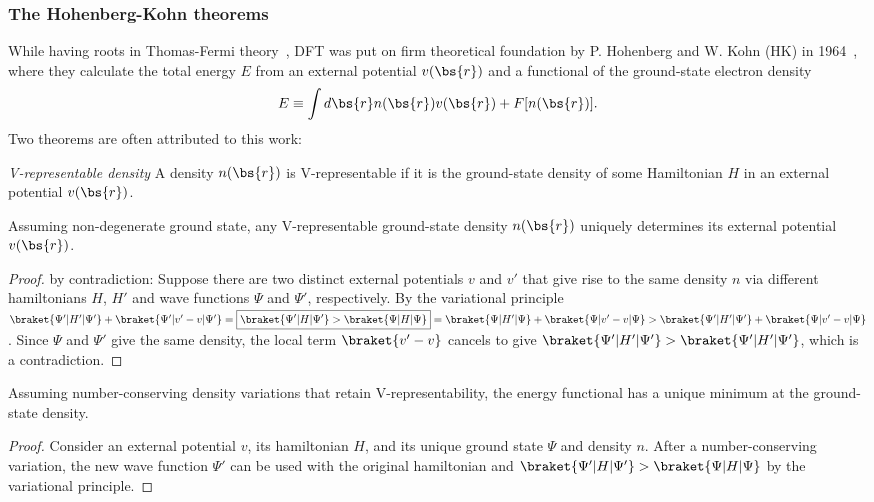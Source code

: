 \subsubsection{The Hohenberg-Kohn theorems}
While having roots in Thomas-Fermi theory~\cite{Parr1989}, DFT was put on firm theoretical foundation by P. Hohenberg and W. Kohn (HK) in 1964~\cite{Hohenberg1964}, where they calculate the total energy $E$ from an external potential $v(\bs{r})$ and a functional of the ground-state electron density
\begin{align}
E\equiv \int d\bs{r} n(\bs{r}) v(\bs{r}) + F[n(\bs{r})].
\end{align}
Two theorems are often attributed to this work:
\begin{definition}
\textit{V-representable density} A density $n(\bs{r})$ is V-representable if it is the ground-state density of some Hamiltonian $H$ in an external potential $v(\bs{r})$.
\end{definition}
\begin{theorem}
Assuming non-degenerate ground state, any V-representable ground-state density $n(\bs{r})$ uniquely determines its external potential $v(\bs{r})$. %
\end{theorem}
\begin{proof}
by contradiction: Suppose there are two distinct external potentials $v$ and $v'$ that give rise to the same density $n$ via different hamiltonians $H$, $H'$ and wave functions $\Psi$ and $\Psi'$, respectively. By the variational principle $\braket{\Psi'|H'|\Psi'}+\braket{\Psi'|v'-v|\Psi'}=\boxed{\braket{\Psi'|H|\Psi'}>\braket{\Psi|H|\Psi}}=\braket{\Psi|H'|\Psi}+\braket{\Psi|v'-v|\Psi}>\braket{\Psi'|H'|\Psi'}+\braket{\Psi|v'-v|\Psi}$. Since $\Psi$ and $\Psi'$ give the same density, the local term $\braket{v'-v}$ cancels to give $\braket{\Psi'|H'|\Psi'}>\braket{\Psi'|H'|\Psi'}$, which is a contradiction.
\end{proof}
\begin{theorem}
Assuming number-conserving density variations that retain V-representability, the energy functional has a unique minimum at the ground-state density.
\end{theorem}
\begin{proof}
Consider an external potential $v$, its hamiltonian $H$, and its unique ground state $\Psi$ and density $n$. After a number-conserving variation, the new wave function $\Psi'$ can be used with the original hamiltonian and $\braket{\Psi'|H|\Psi'}>\braket{\Psi|H|\Psi}$ by the variational principle.
\end{proof}


